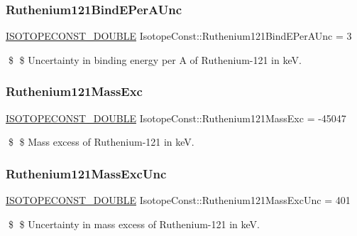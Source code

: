 \subsubsection{\texorpdfstring{Ruthenium121\+Bind\+E\+Per\+A\+Unc}{Ruthenium121BindEPerAUnc}}
{\footnotesize\ttfamily \mbox{\hyperlink{group___isotope_const-_macros_ga8f45a7272ce02c0b4c65c44636ed719a}{I\+S\+O\+T\+O\+P\+E\+C\+O\+N\+S\+T\+\_\+\+D\+O\+U\+B\+LE}} Isotope\+Const\+::\+Ruthenium121\+Bind\+E\+Per\+A\+Unc = 3}

\$ \$ Uncertainty in binding energy per A of Ruthenium-\/121 in keV. \mbox{\label{group___isotope_const-_ruthenium-_ru121_gad0ae1f8f884b9fdc326b58599e350af6}} 
\subsubsection{\texorpdfstring{Ruthenium121\+Mass\+Exc}{Ruthenium121MassExc}}
{\footnotesize\ttfamily \mbox{\hyperlink{group___isotope_const-_macros_ga8f45a7272ce02c0b4c65c44636ed719a}{I\+S\+O\+T\+O\+P\+E\+C\+O\+N\+S\+T\+\_\+\+D\+O\+U\+B\+LE}} Isotope\+Const\+::\+Ruthenium121\+Mass\+Exc = -\/45047}

\$ \$ Mass excess of Ruthenium-\/121 in keV. \mbox{\label{group___isotope_const-_ruthenium-_ru121_gab29acd536a6d94531f659cd7b650c68e}} 
\subsubsection{\texorpdfstring{Ruthenium121\+Mass\+Exc\+Unc}{Ruthenium121MassExcUnc}}
{\footnotesize\ttfamily \mbox{\hyperlink{group___isotope_const-_macros_ga8f45a7272ce02c0b4c65c44636ed719a}{I\+S\+O\+T\+O\+P\+E\+C\+O\+N\+S\+T\+\_\+\+D\+O\+U\+B\+LE}} Isotope\+Const\+::\+Ruthenium121\+Mass\+Exc\+Unc = 401}

\$ \$ Uncertainty in mass excess of Ruthenium-\/121 in keV. \mbox{\label{group___isotope_const-_ruthenium-_ru121_ga238a9494de30dfa39abcfc976169660e}} 

